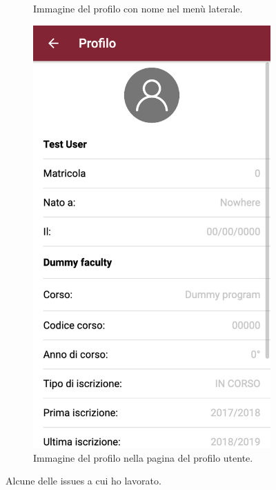 \documentclass[Lau, oneside, noexaminfo]{sapthesis}%
\begin{document}
\begin{figure}[H]
\begin{subfigure}{0.6\textwidth}
		\caption{Immagine del profilo con nome nel menù laterale.}
	\end{subfigure}
	\begin{subfigure}{0.6\textwidth}
		\centering
		\includegraphics[width=0.5\linewidth]{issues/propic-2}
		\caption{Immagine del profilo nella pagina del profilo utente.}
	\end{subfigure}
	\caption{Alcune delle issues a cui ho lavorato.}
	\label{fig:issues}
\end{figure}
\end{document}
